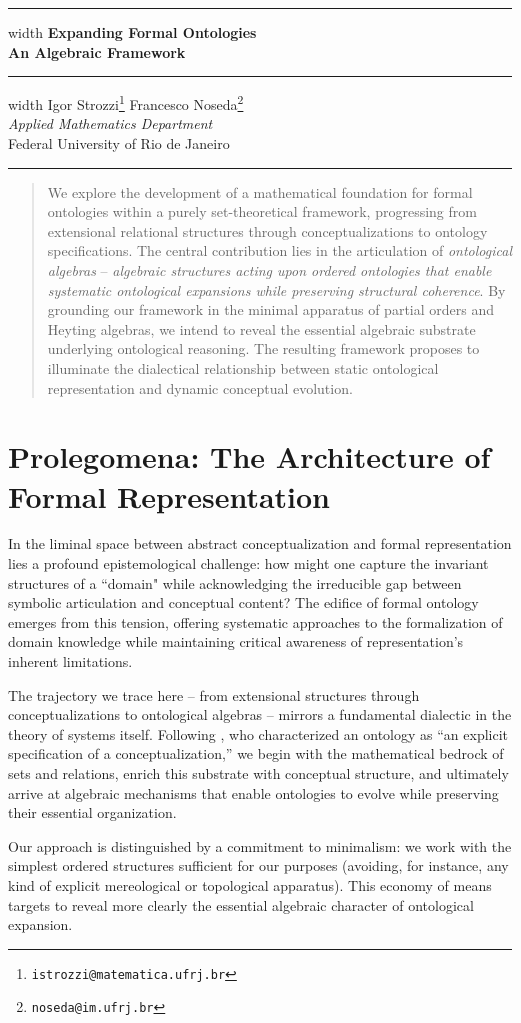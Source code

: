 \documentclass[12pt,a4paper]{article}
\date{\today}
\makeatletter
\newcommand{\nomeautorum}{Igor Strozzi}
\newcommand{\nomeautordois}{Francesco Noseda}
\newcommand{\emailum}{istrozzi@matematica.ufrj.br}
\newcommand{\emaildois}{noseda@im.ufrj.br}
\newcommand{\ctitle}{Expanding Formal Ontologies \vspace{0.5cm}
	\\\Large{An Algebraic Framework}}
\newcommand{\maketitlecustom}{
	\thispagestyle{empty}
	\begin{center}
		\hrule height 2pt width \textwidth
		\vspace{0.4cm}
		{\LARGE \textbf{\ctitle}} \\[0.4cm]
		\hrule height 2pt width \textwidth
		\vspace{0.8cm}
		{\Large \nomeautorum\footnote{\texttt{\emailum}} \quad \nomeautordois\footnote{\texttt{\emaildois}}} \\
		\vspace{0.8cm}
		\large{\textit{Applied Mathematics Department}\\
			Federal University of Rio de Janeiro}
	\end{center}
	\vspace{0.5cm}
	\hrule height 1pt
	\vspace{0.5cm}
}
\makeatother
\begin{document}
\maketitlecustom


\begin{abstract}
\large{We explore the development of a mathematical foundation for formal ontologies within a purely set-theoretical framework, progressing from extensional relational structures through conceptualizations to ontology specifications. The central contribution lies in the articulation of \emph{ontological algebras} -- \textit{algebraic structures acting upon ordered ontologies that enable systematic ontological expansions while preserving structural coherence}. By grounding our framework in the minimal apparatus of partial orders and Heyting algebras, we intend to reveal the essential algebraic substrate underlying ontological reasoning. The resulting framework proposes to illuminate the dialectical relationship between static ontological representation and dynamic conceptual evolution.}
\end{abstract}

\newpage
\tableofcontents
\newpage
\section{Prolegomena: The Architecture of Formal Representation}

In the liminal space between abstract conceptualization and formal representation lies a profound epistemological challenge: how might one capture the invariant structures of a ``domain" while acknowledging the irreducible gap between symbolic articulation and conceptual content? The edifice of formal ontology emerges from this tension, offering systematic approaches to the formalization of domain knowledge while maintaining critical awareness of representation's inherent limitations.

The trajectory we trace here -- from extensional structures through conceptualizations to ontological algebras -- mirrors a fundamental dialectic in the theory of systems itself. Following \citet{gruber1993, guarino2009}, who characterized an ontology as ``an explicit specification of a conceptualization,'' we begin with the mathematical bedrock of sets and relations, enrich this substrate with conceptual structure, and ultimately arrive at algebraic mechanisms that enable ontologies to evolve while preserving their essential organization.

Our approach is distinguished by a commitment to minimalism: we work with the simplest ordered structures sufficient for our purposes (avoiding, for instance, any kind of explicit mereological or topological apparatus). This economy of means targets to reveal more clearly the essential algebraic character of ontological expansion.
\end{document}
